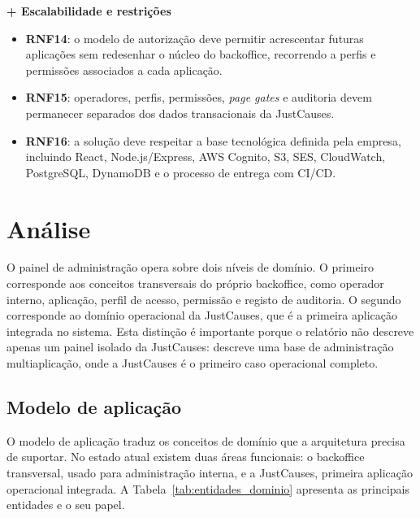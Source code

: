 \noindent\textbf{+ Escalabilidade e restrições}
\begin{itemize}
  \item \textbf{RNF14}: o modelo de autorização deve permitir acrescentar futuras aplicações sem redesenhar o núcleo do backoffice, recorrendo a perfis e permissões associados a cada aplicação.
  \item \textbf{RNF15}: operadores, perfis, permissões, \textit{page gates} e auditoria devem permanecer separados dos dados transacionais da JustCauses.
  \item \textbf{RNF16}: a solução deve respeitar a base tecnológica definida pela empresa, incluindo React, Node.js/Express, AWS Cognito, S3, SES, CloudWatch, PostgreSQL, DynamoDB e o processo de entrega com \gls{CI/CD}.
\end{itemize}


\section{Análise}
\label{sec:analise_dominio}

O painel de administração opera sobre dois níveis de domínio. O primeiro corresponde aos conceitos transversais do próprio backoffice, como operador interno, aplicação, perfil de acesso, permissão e registo de auditoria. O segundo corresponde ao domínio operacional da JustCauses, que é a primeira aplicação integrada no sistema. Esta distinção é importante porque o relatório não descreve apenas um painel isolado da JustCauses: descreve uma base de administração multiaplicação, onde a JustCauses é o primeiro caso operacional completo.

\subsection{Modelo de aplicação}
\label{subsec:modelo_aplicacao}

O modelo de aplicação traduz os conceitos de domínio que a arquitetura precisa de suportar. No estado atual existem duas áreas funcionais: o backoffice transversal, usado para administração interna, e a JustCauses, primeira aplicação operacional integrada. A Tabela~\ref{tab:entidades_dominio} apresenta as principais entidades e o seu papel.

